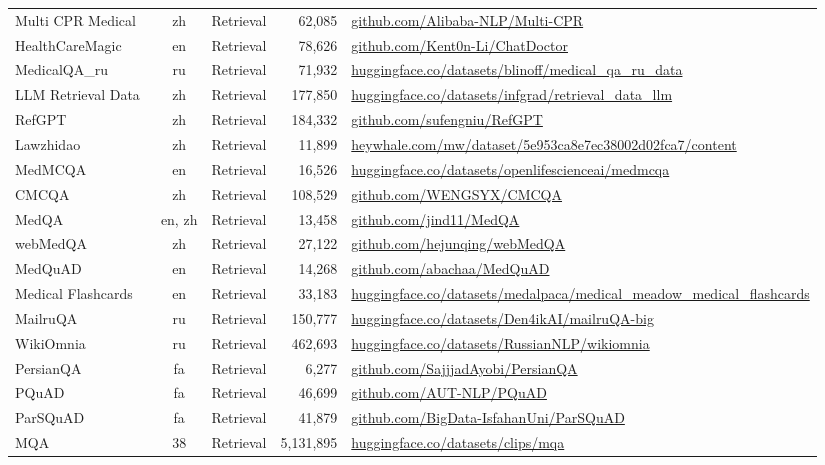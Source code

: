 \begin{table}[th]
{\begin{tabular}{lccrm{9cm}}
Multi CPR Medical~\citep{2022multicprmedical} & zh & Retrieval & 62,085 & \url{github.com/Alibaba-NLP/Multi-CPR} \\
HealthCareMagic~\citep{2023healthcaremagic} & en & Retrieval & 78,626 & \url{github.com/Kent0n-Li/ChatDoctor} \\
MedicalQA\_ru~\citep{2022medicalqaru} & ru & Retrieval & 71,932 & \url{huggingface.co/datasets/blinoff/medical_qa_ru_data} \\
LLM Retrieval Data~\citep{2024llm_retrieval_data} & zh & Retrieval & 177,850 & \url{huggingface.co/datasets/infgrad/retrieval_data_llm} \\
RefGPT~\citep{2023refgpt} & zh & Retrieval & 184,332 & \url{github.com/sufengniu/RefGPT} \\
Lawzhidao~\citep{2020lawzhidao} & zh & Retrieval & 11,899 & \url{heywhale.com/mw/dataset/5e953ca8e7ec38002d02fca7/content} \\
MedMCQA~\citep{2022MedMCQA} & en & Retrieval & 16,526 & \url{huggingface.co/datasets/openlifescienceai/medmcqa} \\
CMCQA~\citep{2022CMCQA} & zh & Retrieval & 108,529 & \url{github.com/WENGSYX/CMCQA} \\
MedQA~\citep{2020MedQA} & en, zh & Retrieval & 13,458 & \url{github.com/jind11/MedQA} \\
webMedQA~\citep{2019webMedQA} & zh & Retrieval & 27,122 & \url{github.com/hejunqing/webMedQA} \\
MedQuAD~\citep{2019MedQuAD} & en & Retrieval & 14,268 & \url{github.com/abachaa/MedQuAD} \\
Medical Flashcards~\citep{2023medical_flashcards} & en & Retrieval & 33,183 & \url{huggingface.co/datasets/medalpaca/medical_meadow_medical_flashcards} \\
MailruQA~\citep{2022mailruqa} & ru & Retrieval & 150,777 & \url{huggingface.co/datasets/Den4ikAI/mailruQA-big} \\
WikiOmnia~\citep{2022wikiomnia} & ru & Retrieval & 462,693 & \url{huggingface.co/datasets/RussianNLP/wikiomnia} \\
PersianQA~\citep{2021PersianQA} & fa & Retrieval & 6,277 & \url{github.com/SajjjadAyobi/PersianQA} \\
PQuAD~\citep{2023PQuAD} & fa & Retrieval & 46,699 & \url{github.com/AUT-NLP/PQuAD} \\
ParSQuAD~\citep{2021parsquad} & fa & Retrieval & 41,879 & \url{github.com/BigData-IsfahanUni/ParSQuAD} \\
MQA~\citep{2021mqa} & 38 & Retrieval & 5,131,895 & \url{huggingface.co/datasets/clips/mqa} \\

\end{tabular}}
\end{table}
